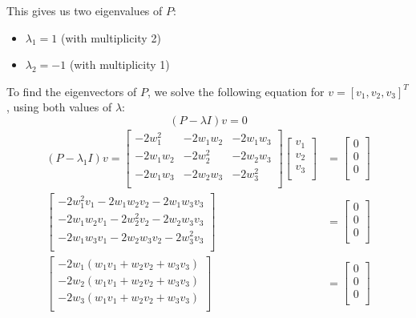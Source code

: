 This gives us two eigenvalues of $P$:
\begin{itemize}
    \item $\lambda_1 = 1$ (with multiplicity 2)
    \item $\lambda_2 = -1$ (with multiplicity 1)
\end{itemize}

To find the eigenvectors of $P$, we solve the following equation for $v = [v_1, v_2, v_3]^T$, using both values of $\lambda$:
\begin{equation}
    (P - \lambda I)v = 0
\end{equation}
\begin{align*}
    (P - \lambda_1 I)v = \begin{bmatrix}
        - 2 w_1^2 & -2 w_1 w_2 & -2 w_1 w_3 \\
        -2 w_1 w_2 & - 2 w_2^2 & -2 w_2 w_3 \\
        -2 w_1 w_3 & -2 w_2 w_3 & - 2 w_3^2\\
    \end{bmatrix} \begin{bmatrix}
        v_1 \\ v_2 \\ v_3 \\
    \end{bmatrix} &= \begin{bmatrix}
        0 \\ 0 \\ 0 \\
    \end{bmatrix} \\  
    \begin{bmatrix}
        -2w_1^2 v_1 - 2w_1 w_2 v_2 - 2w_1 w_3 v_3 \\
        -2w_1 w_2 v_1 - 2w_2^2 v_2 - 2w_2 w_3 v_3 \\
        -2w_1 w_3 v_1 - 2w_2 w_3 v_2 - 2w_3^2 v_3 \\
    \end{bmatrix} &= \begin{bmatrix}
        0 \\ 0 \\ 0 \\
    \end{bmatrix} \\ 
    \begin{bmatrix}
        -2w_1 (w_1 v_1 + w_2 v_2 + w_3 v_3) \\
        -2w_2 (w_1 v_1 + w_2 v_2 + w_3 v_3) \\
        -2w_3 (w_1 v_1 + w_2 v_2 + w_3 v_3) \\
    \end{bmatrix} &= \begin{bmatrix}
        0 \\ 0 \\ 0 \\
    \end{bmatrix} \\ 
\end{align*}
